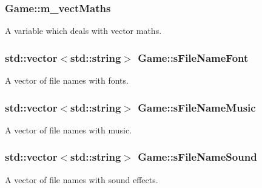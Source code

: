 \subsubsection[{\texorpdfstring{m\+\_\+vect\+Maths}{m_vectMaths}}]{ Game\+::m\+\_\+vect\+Maths\hspace{0.3cm}{\ttfamily [private]}}\hypertarget{class_game_a2f535f85fe3b454b9c708993753f4ecc}{}\label{class_game_a2f535f85fe3b454b9c708993753f4ecc}
A variable which deals with vector maths. 
\subsubsection[{\texorpdfstring{s\+File\+Name\+Font}{sFileNameFont}}]{\setlength{\rightskip}{0pt plus 5cm}std\+::vector$<$std\+::string$>$ Game\+::s\+File\+Name\+Font\hspace{0.3cm}{\ttfamily [private]}}\hypertarget{class_game_a4989e4e035912a6cd8d00c8b2e627b43}{}\label{class_game_a4989e4e035912a6cd8d00c8b2e627b43}
A vector of file names with fonts. 
\subsubsection[{\texorpdfstring{s\+File\+Name\+Music}{sFileNameMusic}}]{\setlength{\rightskip}{0pt plus 5cm}std\+::vector$<$std\+::string$>$ Game\+::s\+File\+Name\+Music\hspace{0.3cm}{\ttfamily [private]}}\hypertarget{class_game_ad6b42e850d075a49c003f32fba1a2dd1}{}\label{class_game_ad6b42e850d075a49c003f32fba1a2dd1}
A vector of file names with music. 
\subsubsection[{\texorpdfstring{s\+File\+Name\+Sound}{sFileNameSound}}]{\setlength{\rightskip}{0pt plus 5cm}std\+::vector$<$std\+::string$>$ Game\+::s\+File\+Name\+Sound\hspace{0.3cm}{\ttfamily [private]}}\hypertarget{class_game_a4bff69d4d76477050669e7f10d8d1da8}{}\label{class_game_a4bff69d4d76477050669e7f10d8d1da8}
A vector of file names with sound effects. 
